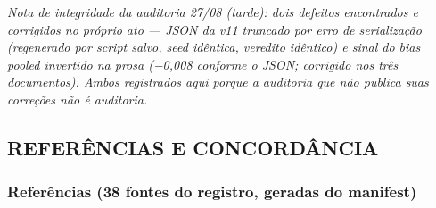 \documentclass[
  10pt,
]{article}
\begin{document}
\emph{Nota de integridade da auditoria 27/08 (tarde): dois defeitos
encontrados e corrigidos no próprio ato --- JSON da v11 truncado por
erro de serialização (regenerado por script salvo, seed idêntica,
veredito idêntico) e sinal do bias pooled invertido na prosa (−0,008
conforme o JSON; corrigido nos três documentos). Ambos registrados aqui
porque a auditoria que não publica suas correções não é auditoria.}

\hypertarget{referuxeancias-e-concorduxe2ncia}{%
\subsection{REFERÊNCIAS E
CONCORDÂNCIA}\label{referuxeancias-e-concorduxe2ncia}}

\hypertarget{referuxeancias-38-fontes-do-registro-geradas-do-manifest}{%
\subsubsection{Referências (38 fontes do registro, geradas do
manifest)}\label{referuxeancias-38-fontes-do-registro-geradas-do-manifest}}
\end{document}
